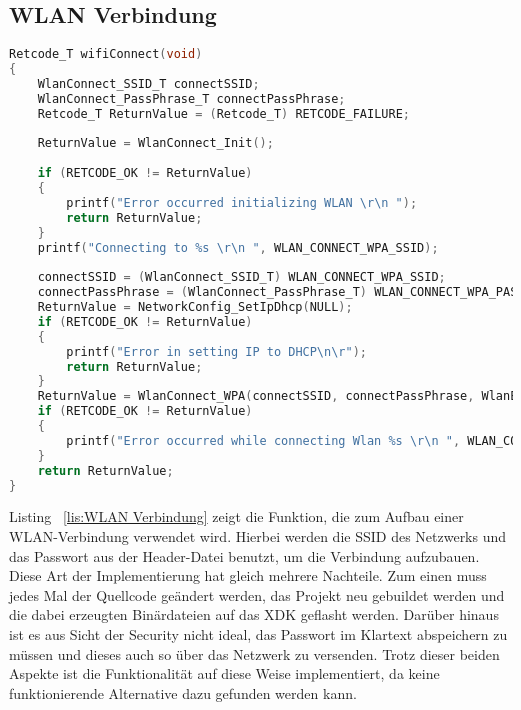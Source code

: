 \subsection{\acs{WLAN} Verbindung}\label{subsec:WLAN Verbindung}
\begin{lstlisting}[language=C, caption={WLAN Verbindung}, label=lis:WLAN Verbindung]
Retcode_T wifiConnect(void)
{
	WlanConnect_SSID_T connectSSID;
	WlanConnect_PassPhrase_T connectPassPhrase;
	Retcode_T ReturnValue = (Retcode_T) RETCODE_FAILURE;
	
	ReturnValue = WlanConnect_Init();
	
	if (RETCODE_OK != ReturnValue)
	{
		printf("Error occurred initializing WLAN \r\n ");
		return ReturnValue;
	}
	printf("Connecting to %s \r\n ", WLAN_CONNECT_WPA_SSID);
	
	connectSSID = (WlanConnect_SSID_T) WLAN_CONNECT_WPA_SSID;
	connectPassPhrase = (WlanConnect_PassPhrase_T) WLAN_CONNECT_WPA_PASS;
	ReturnValue = NetworkConfig_SetIpDhcp(NULL);
	if (RETCODE_OK != ReturnValue)
	{
		printf("Error in setting IP to DHCP\n\r");
		return ReturnValue;
	}
	ReturnValue = WlanConnect_WPA(connectSSID, connectPassPhrase, WlanEventCallback);
	if (RETCODE_OK != ReturnValue)
	{
		printf("Error occurred while connecting Wlan %s \r\n ", WLAN_CONNECT_WPA_SSID);
	}
	return ReturnValue;
}
\end{lstlisting}
Listing ~\ref{lis:WLAN Verbindung} zeigt die Funktion, die zum Aufbau einer \acs{WLAN}-Verbindung verwendet wird. Hierbei werden die \acf{SSID} des Netzwerks und das Passwort aus der Header-Datei benutzt, um die Verbindung aufzubauen. Diese Art der Implementierung hat gleich mehrere Nachteile. Zum einen muss jedes Mal der Quellcode geändert werden, das Projekt neu gebuildet werden und die dabei erzeugten Binärdateien auf das \acs{XDK} geflasht werden. Darüber hinaus ist es aus Sicht der Security nicht ideal, das Passwort im Klartext abspeichern zu müssen und dieses auch so über das Netzwerk zu versenden.\newline
Trotz dieser beiden Aspekte ist die Funktionalität auf diese Weise implementiert, da keine funktionierende Alternative dazu gefunden werden kann. ~\cite{XDK.Wifi}
